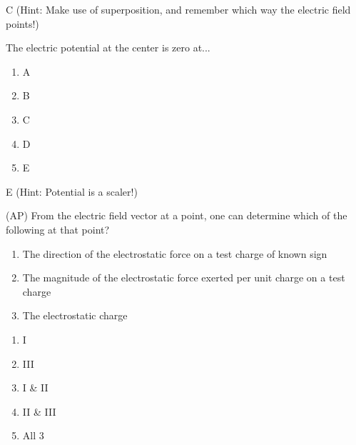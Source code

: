 \begin{solution}
C (Hint: Make use of superposition, and remember which way the electric field points!)
\end{solution}


\begin{question}
The electric potential at the center is zero at...
\begin{multicols}{5}
\begin{enumerate}[label=(\alph*)]
    \item A
    \item B
    \item C
    \item D
    \item E
\end{enumerate}
\end{multicols}

\end{question}

\begin{solution}
E (Hint: Potential is a scaler!)
\end{solution}


\begin{question}
(AP) From the electric field vector at a point, one can determine which of the following at that point?

\begin{enumerate}
    \item The direction of the electrostatic force on a test charge of known sign
    \item The magnitude of the electrostatic force exerted per unit charge on a test charge
    \item The electrostatic charge
\end{enumerate}

\begin{multicols}{5}
\begin{enumerate}[label=(\alph*)]
    \item I
    \item III 
    \item I \& II
    \item II \& III
    \item All 3
\end{enumerate}
\end{multicols}

\end{question}

